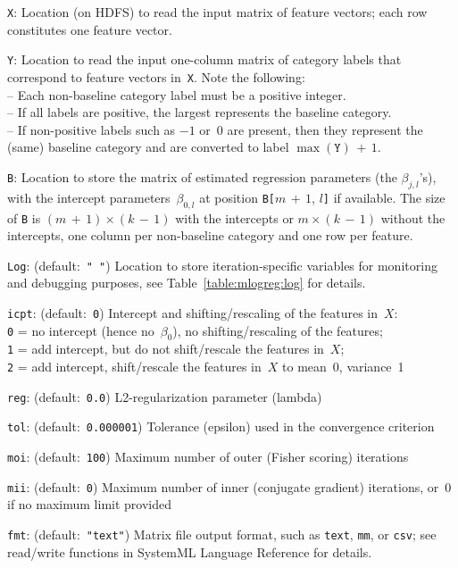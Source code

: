 \smallskip
{}
\begin{Description}
\item[{\tt X}:]
Location (on HDFS) to read the input matrix of feature vectors; each row constitutes
one feature vector.
\item[{\tt Y}:]
Location to read the input one-column matrix of category labels that correspond to
feature vectors in~{\tt X}.  Note the following:\\
-- Each non-baseline category label must be a positive integer.\\
-- If all labels are positive, the largest represents the baseline category.\\
-- If non-positive labels such as $-1$ or~$0$ are present, then they represent the (same)
baseline category and are converted to label $\max(\texttt{Y})\,{+}\,1$.
\item[{\tt B}:]
Location to store the matrix of estimated regression parameters (the $\beta_{j, l}$'s),
with the intercept parameters~$\beta_{0, l}$ at position {\tt B[}$m\,{+}\,1$, $l${\tt ]}
if available.  The size of {\tt B} is $(m\,{+}\,1)\times (k\,{-}\,1)$ with the intercepts
or $m \times (k\,{-}\,1)$ without the intercepts, one column per non-baseline category
and one row per feature.
\item[{\tt Log}:] (default:\mbox{ }{\tt " "})
Location to store iteration-specific variables for monitoring and debugging purposes,
see Table~\ref{table:mlogreg:log} for details.
\item[{\tt icpt}:] (default:\mbox{ }{\tt 0})
Intercept and shifting/rescaling of the features in~$X$:\\
{\tt 0} = no intercept (hence no~$\beta_0$), no shifting/rescaling of the features;\\
{\tt 1} = add intercept, but do not shift/rescale the features in~$X$;\\
{\tt 2} = add intercept, shift/rescale the features in~$X$ to mean~0, variance~1
\item[{\tt reg}:] (default:\mbox{ }{\tt 0.0})
L2-regularization parameter (lambda)
\item[{\tt tol}:] (default:\mbox{ }{\tt 0.000001})
Tolerance (epsilon) used in the convergence criterion
\item[{\tt moi}:] (default:\mbox{ }{\tt 100})
Maximum number of outer (Fisher scoring) iterations
\item[{\tt mii}:] (default:\mbox{ }{\tt 0})
Maximum number of inner (conjugate gradient) iterations, or~0 if no maximum
limit provided
\item[{\tt fmt}:] (default:\mbox{ }{\tt "text"})
Matrix file output format, such as {\tt text}, {\tt mm}, or {\tt csv};
see read/write functions in SystemML Language Reference for details.
\end{Description}


